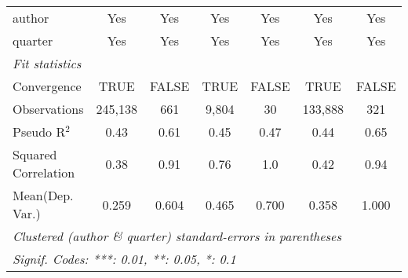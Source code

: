 \begin{tabular}{lcccccc}
   author                                                     & Yes           & Yes           & Yes           & Yes            & Yes            & Yes\\  
   quarter                                                    & Yes           & Yes           & Yes           & Yes            & Yes            & Yes\\  
   \midrule
   \emph{Fit statistics}\\
   Convergence                                                &TRUE           & FALSE         & TRUE          & FALSE          & TRUE           & FALSE\\  
   Observations                                               & 245,138       & 661           & 9,804         & 30             & 133,888        & 321\\  
   Pseudo R$^2$                                               & 0.43          & 0.61          & 0.45          & 0.47           & 0.44           & 0.65\\  
   Squared Correlation                                        & 0.38          & 0.91          & 0.76          & 1.0            & 0.42           & 0.94\\  
Mean(Dep. Var.) & 0.259 & 0.604 & 0.465 & 0.700 & 0.358 & 1.000 \\
   \midrule \midrule
   \multicolumn{7}{l}{\emph{Clustered (author \& quarter) standard-errors in parentheses}}\\
   \multicolumn{7}{l}{\emph{Signif. Codes: ***: 0.01, **: 0.05, *: 0.1}}\\
\end{tabular}
\par\endgroup
